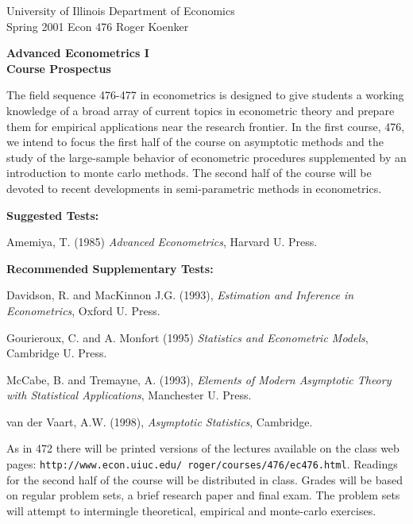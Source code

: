 \documentclass[12pt]{article}
\newcommand{\Ref}[1]{\medskip\noindent\hangafter=1
      \hangindent=20pt\ignorespaces #1}
\begin{document}
\noindent
University of Illinois \hfill Department of Economics \\
Spring 2001 \hfill Econ 476 \hfill Roger Koenker

\begin{center}
\large{
{\bf Advanced Econometrics I \\
\vspace{2mm}
Course Prospectus}}
\end{center}

\vspace{10mm}
The field sequence 476-477 in econometrics is designed to give students a 
working knowledge of a broad array of current topics in econometric theory and 
prepare them for empirical applications near the research frontier.  In the 
first course, 476, we intend to focus the first half of the course on 
asymptotic methods and the study of the large-sample behavior of econometric 
procedures supplemented by an introduction to monte carlo 
methods.  The second half of the course will be devoted to recent developments 
in semi-parametric methods in econometrics.

\vspace{5mm}
\noindent
{\bf Suggested Tests:}

\Ref Amemiya, T. (1985)  {\it Advanced Econometrics}, Harvard U. Press.


\vspace{5mm}
\noindent
{\bf Recommended Supplementary Tests:}

\Ref Davidson, R. and MacKinnon J.G. (1993), {\em Estimation and Inference in 
Econometrics}, Oxford U. Press.

\Ref Gourieroux, C. and A. Monfort (1995) 
{\it Statistics and Econometric Models}, Cambridge U. Press.

\Ref McCabe, B. and Tremayne, A. (1993), {\em Elements of Modern Asymptotic 
Theory with Statistical Applications}, Manchester U. Press.

\Ref van der Vaart, A.W. (1998), {\em Asymptotic Statistics}, Cambridge. 

\vspace{5mm}
\noindent
As in 472 there will be printed versions of the lectures available on
the class web pages: 
{\tt http://www.econ.uiuc.edu/~roger/courses/476/ec476.html}.
Readings for the second half of the course will be distributed in class.
Grades will be based on 
regular problem sets, a brief research paper and final exam. 
The problem sets will attempt to intermingle theoretical, 
empirical and monte-carlo exercises.
\end{document}
